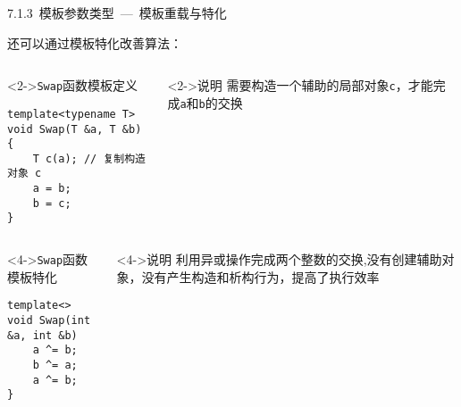 \begin{frame}[fragile]{7.1.3~模板参数类型\normalsize{~---~模板重载与特化}}

还可以通过模板特化改善算法：

\vspace{-4mm}

\begin{columns}[t]

\begin{blueblock}<2->{\texttt{Swap}函数模板定义}
\vspace{-2.5mm}\begin{lstlisting}[moreemph={T}]
template<typename T>
void Swap(T &a, T &b) {
    T c(a); // 复制构造对象 c
    a = b;
    b = c;
}
\end{lstlisting}\vspace{-2mm}
\end{blueblock}

\begin{yellowblock}<2->{说明}
需要构造一个辅助的局部对象\texttt{c}，才能完成\texttt{a}和\texttt{b}的交换
\end{yellowblock}

\end{columns}



\vspace{-4mm}

\begin{columns}[t]

\begin{blueblock}<4->{\texttt{Swap}函数模板特化}
\vspace{-2.5mm}\begin{lstlisting}[moreemph={T}]
template<>
void Swap(int &a, int &b)
    a ^= b;
    b ^= a;
    a ^= b;
}
\end{lstlisting}\vspace{-2mm}
\end{blueblock}

\begin{yellowblock}<4->{说明}
利用异或操作完成两个整数的交换,没有创建辅助对象，没有产生构造和析构行为，提高了执行效率
\end{yellowblock}

\end{columns}

\end{frame}

